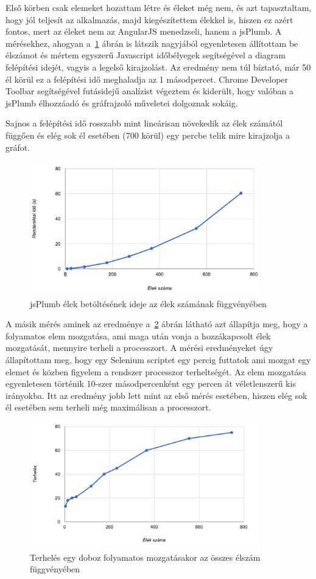 Első körben csak elemeket hozattam létre és éleket még nem, és azt tapasztaltam, hogy jól teljesít az alkalmazás, majd kiegészítettem élekkel is, hiszen ez azért fontos, mert az éleket nem az AngularJS menedzseli, hanem a jsPlumb. A mérésekhez, ahogyan a~\ref{fig:plumb} ábrán is látszik nagyjából egyenletesen állítottam be élszámot és mértem egyszerű Javascript időbélyegek segítségével a diagram felépítési idejét, vagyis a legelső kirajzolást. Az eredmény nem túl bíztató, már 50 él körül ez a felépítési idő meghaladja az 1 másodpercet. Chrome Developer Toolbar segítségével futásidejű analízist végeztem és kiderült, hogy valóban a jsPlumb élhozzáadó és gráfrajzoló műveletei dolgoznak sokáig. 

Sajnos a felépítési idő rosszabb mint lineárisan növekedik az élek számától függően és elég sok él esetében (700 körül) egy percbe telik mire kirajzolja a gráfot.  


\begin{figure}[!ht]
\centering
\includegraphics[width=10cm,keepaspectratio]{figures/plumb.png}
\caption{jsPlumb élek betöltésének ideje az élek számának függvényében}
\label{fig:plumb}
\end{figure}

A másik mérés aminek az eredménye a~\ref{fig:plumb2} ábrán látható azt állapítja meg, hogy a folyamatos elem mozgatása, ami maga után vonja a hozzákapcsolt élek mozgatását, mennyire terheli a processzort. A mérési eredményeket úgy állapítottam meg, hogy egy Selenium scriptet egy percig futtatok ami mozgat egy elemet és közben figyelem a rendszer processzor terheltségét. Az elem mozgatása egyenletesen történik 10-szer másodpercenként egy percen át véletlenszerű kis irányokba. Itt az eredmény jobb lett mint az első mérés esetében, hiszen elég sok él esetében sem terheli még maximálisan a processzort. 

\begin{figure}[!ht]
\centering
\includegraphics[width=10cm,keepaspectratio]{figures/plumb2.png}
\caption{Terhelés egy doboz folyamatos mozgatásakor az összes élszám függvényében}
\label{fig:plumb2}
\end{figure}

